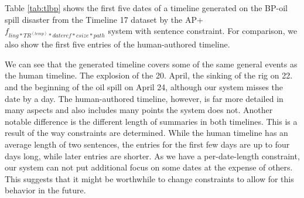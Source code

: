 \documentclass[a4paper,BCOR=10mm]{report}
\numberwithin{lemma}{chapter}
\numberwithin{definition}{chapter}
\begin{document}

Table \ref{tab:tlbp} shows the first five dates of a timeline generated on the BP-oil spill disaster from the Timeline 17 dataset by the AP+$f_{ ling*TR^{(temp)}*\mathit{dateref}*\mathit{csize}*\mathit{path} }$ system with sentence constraint.
For comparison, we also show the first five entries of the human-authored timeline.

We can see that the generated timeline covers some of the same general events as the human timeline.
The explosion of the 20. April, the sinking of the rig on 22. and the beginning of the oil spill on April 24, although our system misses the date by a day. The human-authored timeline, however, is far more detailed in many aspects and also includes many points the system does not.
Another notable difference is the different length of summaries in both timelines. This is a result of the way constraints are determined. While the human timeline has an average length of two sentences, the entries for the first few days are up to four days long, while later entries are shorter.
As we have a per-date-length constraint, our system can not put additional focus on some dates at the expense of others. This suggests that it might be worthwhile to change constraints to allow for this behavior in the future.
\end{document}
